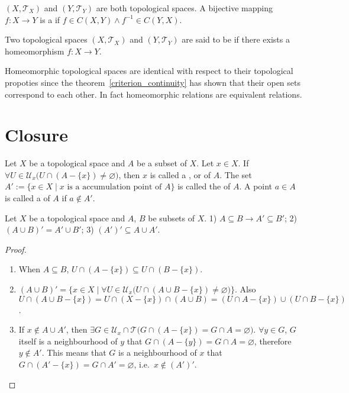 \documentclass[openany]{book}
\begin{document}
\begin{definition}\label{homeomorphism}
$(X,\mathscr{T}_X)$ and $(Y,\mathscr{T}_Y)$ are both topological spaces. A bijective mapping $f \colon X\to Y$ is a  if $f \in C( X, Y) \wedge f ^{ -1} \in C( Y, X)$. 
\end{definition}
\begin{definition}\label{homeomorphic}
Two topological spaces $(X,\mathscr{T}_X)$ and $(Y, \mathscr{T}_Y)$ are said to be  if there exists a homeomorphism $f \colon X\to Y$.
\end{definition}

Homeomorphic topological spaces are identical with respect to their topological propoties since the theorem~\ref{criterion_continuity} has shown that their open sets correspond to each other. In fact homeomorphic relations are equivalent relations.

\section{Closure}
\begin{definition}\label{accumulation_point}
Let $X$ be a topological space and $A$ be a subset of $X$. Let $x\in X$.
If $\forall U\in \mathscr U_x \big(
	U\cap (A-\{x\}) \neq \varnothing\big)$, 
then $x$ is called a ,  or  of $A$. 
The set $A' := \{x\in X\mid x\text{ is a accumulation point of } A\}$ is called the  of $A$.
A point $a\in A$ is called a  of $A$ if $a\notin A'$.
\end{definition}

\begin{theorem}\label{propoties_derived}
Let $X$ be a topological space and $A$, $B$ be subsets of $X$. 
1) $A\subseteq B \to A'\subseteq B'$; 
2) $(A\cup B)' = A'\cup B'$;
3) $(A')' \subseteq A\cup A'$.
\end{theorem}
\begin{proof}
\begin{enumerate}[label=\arabic*)]
\item When $A\subseteq B$, $U\cap (A-\{x\}) \subseteq U\cap (B-\{x\})$.
\item $(A\cup B)' = \{x\in X\mid \forall U\in \mathscr U_x \big(
	U\cap (A\cup B-\{x\}) \neq \varnothing\big)\}$. 
Also $U\cap (A\cup B - \{x\}) = U\cap (X-\{x\})\cap (A\cup B) = (U\cap A-\{x\})\cup (U\cap B-\{x\})$.
\item If $x\notin A\cup A'$, then $\exists G\in \mathscr U_x\cap \mathscr T \big(
	G\cap (A-\{x\}) = G\cap A = \varnothing\big)$. 
$\forall y \in G$, $G$ itself is a neighbourhood of $y$ that $G\cap (A-\{y\}) = G\cap A =\varnothing$, therefore $y\notin A'$. 
This means that $G$ is a neighbourhood of $x$ that $G\cap (A'-\{x\}) = G\cap A' =\varnothing$, i.e.\ $x\notin (A')'$.
\end{enumerate}
\end{proof}
\end{document}
